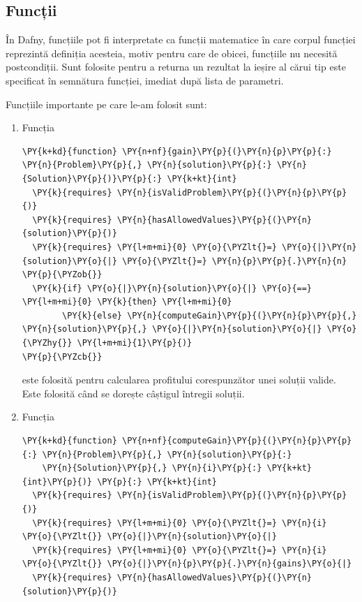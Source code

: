 \begin{sloppypar}
\subsection{Funcții}
În Dafny, funcțiile pot fi interpretate ca funcții matematice în care corpul funcției reprezintă definiția acesteia, motiv pentru care de obicei, funcțiile nu necesită postcondiții. Sunt folosite pentru a returna un rezultat la ieșire al cărui tip este specificat în semnătura funcției, imediat după lista de parametri. \par 
Funcțiile importante pe care le-am folosit sunt:
\begin{enumerate}
    \item Funcția 
    \begin{Verbatim}[commandchars=\\\{\}]
\PY{k+kd}{function} \PY{n+nf}{gain}\PY{p}{(}\PY{n}{p}\PY{p}{:} \PY{n}{Problem}\PY{p}{,} \PY{n}{solution}\PY{p}{:} \PY{n}{Solution}\PY{p}{)}\PY{p}{:} \PY{k+kt}{int}
  \PY{k}{requires} \PY{n}{isValidProblem}\PY{p}{(}\PY{n}{p}\PY{p}{)}
  \PY{k}{requires} \PY{n}{hasAllowedValues}\PY{p}{(}\PY{n}{solution}\PY{p}{)}
  \PY{k}{requires} \PY{l+m+mi}{0} \PY{o}{\PYZlt{}=} \PY{o}{|}\PY{n}{solution}\PY{o}{|} \PY{o}{\PYZlt{}=} \PY{n}{p}\PY{p}{.}\PY{n}{n}
\PY{p}{\PYZob{}}
  \PY{k}{if} \PY{o}{|}\PY{n}{solution}\PY{o}{|} \PY{o}{==} \PY{l+m+mi}{0} \PY{k}{then} \PY{l+m+mi}{0} 
        \PY{k}{else} \PY{n}{computeGain}\PY{p}{(}\PY{n}{p}\PY{p}{,} \PY{n}{solution}\PY{p}{,} \PY{o}{|}\PY{n}{solution}\PY{o}{|} \PY{o}{\PYZhy{}} \PY{l+m+mi}{1}\PY{p}{)}
\PY{p}{\PYZcb{}}
\end{Verbatim}
    este folosită pentru calcularea profitului corespunzător unei soluții valide. Este folosită când se dorește câștigul întregii soluții.
    \item Funcția 
    \begin{Verbatim}[commandchars=\\\{\}]
\PY{k+kd}{function} \PY{n+nf}{computeGain}\PY{p}{(}\PY{n}{p}\PY{p}{:} \PY{n}{Problem}\PY{p}{,} \PY{n}{solution}\PY{p}{:} 
    \PY{n}{Solution}\PY{p}{,} \PY{n}{i}\PY{p}{:} \PY{k+kt}{int}\PY{p}{)} \PY{p}{:} \PY{k+kt}{int}
  \PY{k}{requires} \PY{n}{isValidProblem}\PY{p}{(}\PY{n}{p}\PY{p}{)}
  \PY{k}{requires} \PY{l+m+mi}{0} \PY{o}{\PYZlt{}=} \PY{n}{i} \PY{o}{\PYZlt{}} \PY{o}{|}\PY{n}{solution}\PY{o}{|}
  \PY{k}{requires} \PY{l+m+mi}{0} \PY{o}{\PYZlt{}=} \PY{n}{i} \PY{o}{\PYZlt{}} \PY{o}{|}\PY{n}{p}\PY{p}{.}\PY{n}{gains}\PY{o}{|}
  \PY{k}{requires} \PY{n}{hasAllowedValues}\PY{p}{(}\PY{n}{solution}\PY{p}{)}

\end{Verbatim}
\end{enumerate}
\end{sloppypar}
